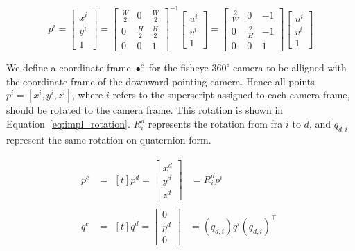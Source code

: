 \begin{equation}
    p^i = \begin{bmatrix}
        x^i \\ y^i \\ 1
    \end{bmatrix} = \begin{bmatrix}
        \frac{W}{2} & 0 & \frac{W}{2} \\
        0 & \frac{H}{2} & \frac{H}{2} \\
        0 & 0 & 1
    \end{bmatrix}^{-1}\begin{bmatrix}
        u^i \\ v^i \\ 1
    \end{bmatrix} = \begin{bmatrix}
        \frac{2}{W} & 0 & -1 \\
        0 & \frac{2}{H} & -1 \\
        0 & 0 & 1
    \end{bmatrix}\begin{bmatrix}
        u^i \\ v^i \\ 1
    \end{bmatrix}
    \label{eq:impl_pixel_inverse_transform}
\end{equation}

We define a coordinate frame $\bullet^c$ for the fisheye $360^\circ$ camera to be alligned with the coordinate frame of the downward pointing camera. Hence all points $p^i = [x^i,y^i,z^i]$, where $i$ refers to the superscript assigned to each camera frame, should be rotated to the camera frame. This rotation is shown in Equation~\eqref{eq:impl_rotation}. $R^d_i$ represents the rotation from fra $i$ to $d$, and $q_{d,i}$ represent the same rotation on quaternion form.

\begin{subequations}
    \begin{align}
        p^c &= \!\begin{aligned}[t]
            p^d = \begin{bmatrix} x^d \\ y^d \\ z^d \end{bmatrix} &= R^d_i p^i
        \end{aligned} \label{eq:impl_rotation_R} \\[0.75ex]
        q^c &= \!\begin{aligned}[t]
            q^d = \begin{bmatrix} 0 \\ p^d \\ 0 \end{bmatrix} &= (q_{d,i})q^i(q_{d,i})^\top
        \end{aligned} \label{eq:impl_rotation_q}
    \end{align}
    \label{eq:impl_rotation}
\end{subequations}

